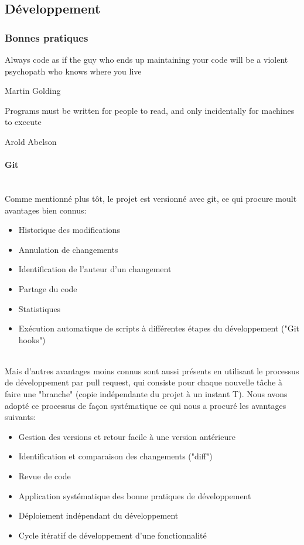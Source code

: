 \documentclass[a4paper,french,12pt]{article}
\begin{document}
	\subsection{Développement}

	  \subsubsection{Bonnes pratiques}
	    \epigraph{Always code as if the guy who ends up maintaining your code will be a violent psychopath who knows where you live}{Martin Golding}
	    \epigraph{Programs must be written for people to read, and only incidentally for machines to execute}{Arold Abelson}

	\paragraph{Git}~\\	
	    Comme mentionné plus tôt, le projet est versionné avec git, ce qui procure moult avantages bien connus:~\\
	    
	    \begin{itemize}
	    	\item Historique des modifications
	    	\item Annulation de changements
	    	\item Identification de l'auteur d'un changement
	    	\item Partage du code
	    	\item Statistiques
	    	\item Exécution automatique de scripts à différentes étapes du développement ("Git hooks")
	    \end{itemize}~\\
	    
 Mais d'autres avantages moins connus sont aussi présents en utilisant le processus de développement par pull request, qui consiste pour chaque nouvelle tâche à faire une "branche" (copie indépendante du projet à un instant T). Nous avons adopté ce processus de façon systématique ce qui nous a procuré les avantages suivants:~\\
 
 	\begin{itemize}
 		\item Gestion des versions et retour facile à une version antérieure
 		\item Identification et comparaison des changements ("diff")
 		\item Revue de code
 		\item Application systématique des bonne pratiques de développement
 		\item Déploiement indépendant du développement
 		\item Cycle itératif de développement d'une fonctionnalité
 	\end{itemize}
 	
\end{document}
